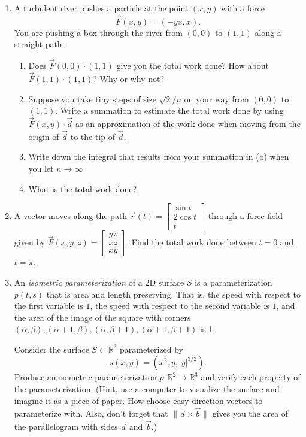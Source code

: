 \documentclass[letter]{article}
\newcommand{\R}{\mathbb{R}}
\newcommand{\mat}[1]{\begin{bmatrix}#1\end{bmatrix}}
\begin{document}
	\begin{enumerate}[resume]
		\item A turbulent river pushes a particle at the point $(x,y)$ with a force
			\[
				\vec F(x,y) = (-yx,x).
			\]
			You are pushing a box through the river from $(0,0)$ to $(1,1)$ along a 
			straight path.
			\begin{enumerate}
				\item Does $\vec F(0,0)\cdot (1,1)$ give you the total work done?
					How about $\vec F(1,1)\cdot (1,1)$?  Why or why not?
				\item Suppose you take tiny steps of size $\sqrt{2}/n$ on your way
					from $(0,0)$ to $(1,1)$.  Write a summation to estimate
					the total work done by using $\vec F(x,y)\cdot \vec d$ as
					an approximation of the work done when
					moving from the origin of $\vec d$
					to the tip of $\vec d$.
				\item Write down the integral that results from your summation in
					(b) when you let $n\to \infty$.
				\item What is the total work done?
			\end{enumerate}
		
		\item A vector moves along the path $\vec r(t) = \mat{\sin t\\ 2\cos t\\ t}$ through a force field given by
			$\vec F(x,y,z)=\mat{yz\\ xz\\ xy}$.  Find the total work done between $t=0$ and $t=\pi$.

		\item An \emph{isometric parameterization} of a 2D surface $S$ is a parameterization $p(t,s)$
			that is area and length preserving.  That is, the speed with respect to the first variable
			is $1$, the speed with respect to the second variable is $1$, and the area of the image
			of the square with corners $(\alpha,\beta),(\alpha+1,\beta),(\alpha,\beta+1),(\alpha+1,\beta+1)$ is 1.

			Consider the surface $S\subset \R^3$ parameterized by \[
				s(x,y) = (x^2,y, |y|^{3/2}).
			\]
			Produce an isometric parameterization $p:\R^2\to\R^3$ and verify each 
			property of the parameterization. (Hint, use a computer to visualize the surface
			and imagine it as a piece of paper.  How choose easy direction vectors to 
			parameterize with.  Also, don't forget that $\|\vec a\times \vec b\|$ gives you
			the area of the parallelogram with sides $\vec a$ and $\vec b$.)
	\end{enumerate}
\end{document}
